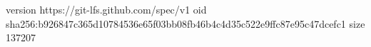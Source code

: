 version https://git-lfs.github.com/spec/v1
oid sha256:b926847c365d10784536e65f03bb08fb46b4c4d35c522e9ffc87e95c47dcefc1
size 137207
